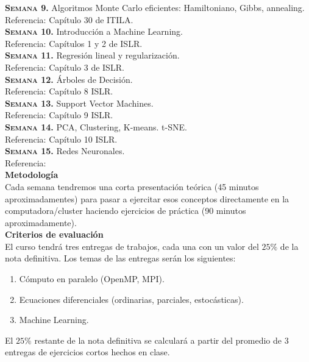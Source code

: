 \documentclass[letterpaper,10pt,onecolumn]{article}
\begin{document}
\noindent\textbf{\textsc{Semana 9.}}
Algoritmos Monte Carlo eficientes: Hamiltoniano, Gibbs, annealing. \\
Referencia: Cap\'itulo 30 de ITILA.
\\[-0.3cm] 

\noindent\textbf{\textsc{Semana 10.}}  
Introducci\'on a Machine Learning. \\
Referencia: Cap\'itulos 1 y 2 de ISLR.
\\[-0.3cm] 

\noindent\textbf{\textsc{Semana 11.}}  
Regresi\'on lineal y regularizaci\'on.\\
Referencia: Cap\'itulo 3 de ISLR.
\\[-0.3cm]

\noindent\textbf{\textsc{Semana 12.}} 
\'Arboles de Decisi\'on.\\
Referencia: Cap\'itulo 8 ISLR. 
\\[-0.3cm]  

\noindent\textbf{\textsc{Semana 13.}} 
Support Vector Machines.\\
Referencia: Cap\'itulo 9 ISLR.
\\[-0.3cm] 

\noindent\textbf{\textsc{Semana 14.}} 
PCA, Clustering, K-means. t-SNE.\\
Referencia: Cap\'itulo 10 ISLR. 
\\[-0.3cm] 

\noindent\textbf{\textsc{Semana 15.}} 
Redes Neuronales.\\
Referencia: 
\\[-0.1cm]  


\noindent\textbf{\large {} \quad
  Metodolog\'ia}\\[-0.2cm] 


\noindent\normalsize Cada semana tendremos una corta presentaci\'on
te\'orica (45 minutos aproximadamentes) para pasar a ejercitar esos
conceptos directamente en la computadora/cluster haciendo
ejercicios de pr\'actica (90 minutos aproximadamente). \\[0.1cm]


\noindent\textbf{\large {} \quad Criterios de
  evaluaci\'on}\\[-0.2cm] 


El curso tendr\'a tres entregas de trabajos, cada una con un valor
del $25\%$ de la nota definitiva. Los temas de las entregas ser\'an
los siguientes:
\begin{enumerate}
\item C\'omputo en paralelo (OpenMP, MPI).\\[-0.6cm]
\item Ecuaciones diferenciales (ordinarias, parciales, estoc\'asticas).\\[-0.6cm]
\item Machine Learning.\\[-0.2cm]
\end{enumerate}
\noindent
El $25\%$ restante de la nota definitiva se calcular\'a a partir del
promedio de $3$ entregas de ejercicios cortos hechos en clase. 
\end{document}
